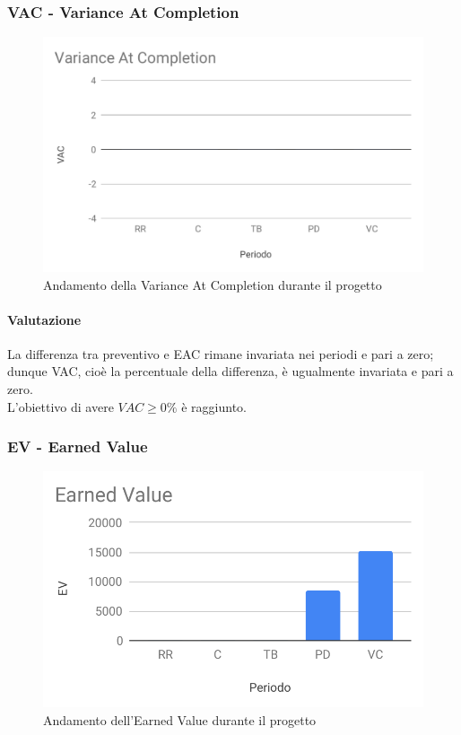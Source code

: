 \subsubsection{VAC - Variance At Completion}
\begin{figure}[H]
	\centering
	\includegraphics[scale=0.7]{res/images/RA/vac.pdf}
	\caption{Andamento della Variance At Completion durante il progetto}
\end{figure}
\paragraph*{Valutazione}
La differenza tra preventivo e EAC rimane invariata nei periodi e pari a zero; dunque VAC, cioè la percentuale della differenza, è ugualmente invariata e pari a zero. \\
L'obiettivo di avere $VAC \geq 0\%$ è raggiunto.

\subsubsection{EV - Earned Value}
\begin{figure}[H]
	\centering
	\includegraphics[scale=0.7]{res/images/RA/ev.pdf}
	\caption{Andamento dell'Earned Value durante il progetto}
\end{figure}
